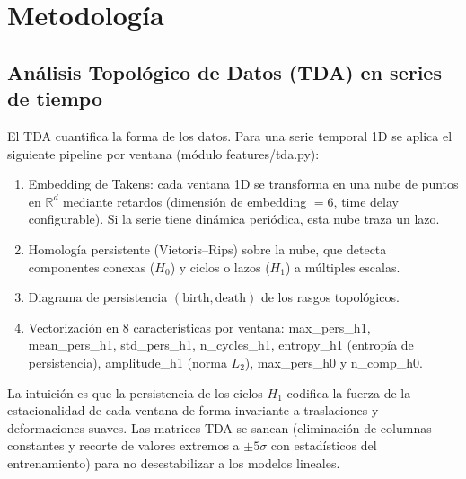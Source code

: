 \documentclass[11pt,a4paper]{article}
\begin{document}
\section{Metodología}

\subsection{Análisis Topológico de Datos (TDA) en series de tiempo}
El TDA cuantifica la forma de los datos. Para una serie temporal 1D se aplica el
siguiente pipeline por ventana (módulo features/tda.py):
\begin{enumerate}[noitemsep]
  \item Embedding de Takens: cada ventana 1D se transforma en una nube de puntos
        en $\mathbb{R}^d$ mediante retardos (dimensión de embedding $=6$,
        time delay configurable). Si la serie tiene dinámica periódica, esta nube
        traza un lazo.
  \item Homología persistente (Vietoris--Rips) sobre la nube, que detecta
        componentes conexas ($H_0$) y ciclos o lazos ($H_1$) a múltiples escalas.
  \item Diagrama de persistencia $(\text{birth},\text{death})$ de los rasgos
        topológicos.
  \item Vectorización en 8 características por ventana: max\_pers\_h1,
        mean\_pers\_h1, std\_pers\_h1, n\_cycles\_h1, entropy\_h1 (entropía de
        persistencia), amplitude\_h1 (norma $L_2$), max\_pers\_h0 y n\_comp\_h0.
\end{enumerate}
La intuición es que la persistencia de los ciclos $H_1$ codifica la fuerza de la
estacionalidad de cada ventana de forma invariante a traslaciones y
deformaciones suaves. Las matrices TDA se sanean (eliminación de columnas
constantes y recorte de valores extremos a $\pm 5\sigma$ con estadísticos del
entrenamiento) para no desestabilizar a los modelos lineales.
\end{document}
